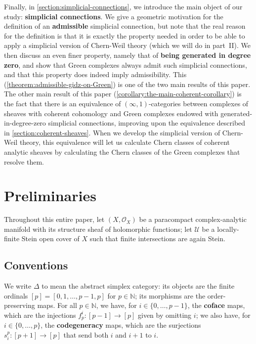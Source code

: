 \documentclass[11pt,fleqn]{article}
\theoremstyle{plain}
\theoremstyle{definition}
\theoremstyle{remark}
\numberwithin{equation}{theorem}
\newcommand{\cover}{\mathcal{U}}
\newcommand{\OO}{\mathcal{O}}
\newcommand{\define}[1]{\textbf{#1}}
\begin{document}
    Finally, in \cref{section:simplicial-connections}, we introduce the main object of our study: \define{simplicial connections}.
    We give a geometric motivation for the definition of an \define{admissible} simplicial connection, but note that the real reason for the definition is that it is exactly the property needed in order to be able to apply a simplicial version of Chern-Weil theory (which we will do in part~II).
    We then discuss an even finer property, namely that of \define{being generated in degree zero}, and show that Gre{}en complexes always admit such simplicial connections, and that this property does indeed imply admissibility.
    This (\cref{theorem:admissible-gidz-on-Green}) is one of the two main results of this paper.
    The other main result of this paper (\cref{corollary:the-main-coherent-corollary}) is the fact that there is an equivalence of $(\infty,1)$-categories between complexes of sheaves with coherent cohomology and Green complexes endowed with generated-in-degree-zero simplicial connections, improving upon the equivalence described in \cref{section:coherent-sheaves}.
    When we develop the simplicial version of Chern-Weil theory, this equivalence will let us calculate Chern classes of coherent analytic sheaves by calculating the Chern classes of the Gre{}en complexes that resolve them.



\section{Preliminaries}\label{section:preliminaries}

    Throughout this entire paper, let $(X,\OO_X)$ be a paracompact complex-analytic manifold with its structure sheaf of holomorphic functions; let $\cover$ be a locally-finite Stein open cover of $X$ such that finite intersections are again Stein.


    \subsection{Conventions}

        We write $\Delta$ to mean the abstract simplex category: its objects are the finite ordinals $[p]=[0,1,\ldots,p-1,p]$ for $p\in\mathbb{N}$; its morphisms are the order-preserving maps.
        For all $p\in\mathbb{N}$, we have, for $i\in\{0,\ldots,p-1\}$, the \define{coface} maps, which are the injections $f_p^i\colon[p-1]\to[p]$ given by omitting $i$; we also have, for $i\in\{0,\ldots,p\}$, the \define{codegeneracy} maps, which are the surjections $s_i^p\colon[p+1]\to[p]$ that send both $i$ and $i+1$ to $i$.
\end{document}
